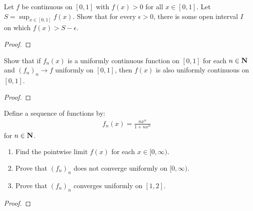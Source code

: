 \documentclass[11pt,twoside,openany]{memoir}
\begin{document}
\newpage
\fancyhead[L]{\scalebox{0.9}{Continuity}}
\fancyhead[R]{\scalebox{0.9}{Appeared on: S23}}
\begin{problem}
    Let $f$ be continuous on $[0,1]$ with $f(x) > 0$ for all $x \in [0,1]$. Let $S = \sup_{x \in [0,1]}f(x)$. Show that for every $\epsilon > 0$, there is some open interval $I$ on which $f(x) > S - \epsilon$.
\end{problem}
\begin{proof}
\end{proof}

\newpage
\fancyhead[L]{\scalebox{0.9}{Continuity}}
\fancyhead[R]{\scalebox{0.9}{Appeared on: W23}}
\begin{problem}
    Show that if $f_n(x)$ is a uniformly continuous function on $[0,1]$ for each $n \in \mathbf{N}$ and $(f_n)_n \rightarrow f$ uniformly on $[0,1]$, then $f(x)$ is also uniformly continuous on $[0,1]$.
\end{problem}
\begin{proof}
\end{proof}

\newpage
\fancyhead[L]{\scalebox{0.9}{Continuity}}
\fancyhead[R]{\scalebox{0.9}{Appeared on: S24}}
\begin{problem}
    Define a sequence of functions by:
        \begin{equation*}
        \begin{split}
            f_n(x) = \frac{nx^n}{1 + nx^n}
        \end{split}
        \end{equation*}
    for $n \in \mathbf{N}$.
    \begin{enumerate}[label = (\arabic*)]
        \item Find the pointwise limit $f(x)$ for each $x \in [0,\infty)$.
        \item Prove that $(f_n)_n$ does not converge uniformly on $[0,\infty)$.
        \item Prove that $(f_n)_n$ converges uniformly on $[1,2]$.
    \end{enumerate}
\end{problem}
\begin{proof}
\end{proof}
\end{document}
